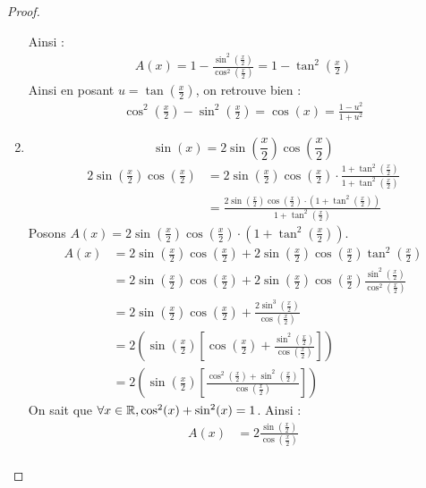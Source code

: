 \begin{proof}
\begin{enumerate}
             Ainsi : 
             \begin{align*}
                 A(x) = 1 - \frac{\sin^2\left( \frac{x}{2} \right)}{\cos^2\left( \frac{x}{2} \right)} = 1 - \tan^2 \left( \frac{x}{2} \right)
             \end{align*}
             Ainsi en posant $u = \tan(\frac{x}{2})$, on retrouve bien :
             \begin{align*}
                 \cos^2\left( \frac{x}{2} \right) - \sin^2\left( \frac{x}{2} \right) = \cos(x) = \frac{1 - u^2}{1 + u^2}
             \end{align*}
     \item \[ \sin(x) =  2 \sin(\frac{x}{2}) \cos(\frac{x}{2}) \]
        \begin{align*}
            2\sin(\frac{x}{2})\cos(\frac{x}{2}) &= 2\sin(\frac{x}{2})\cos(\frac{x}{2}) \cdot \frac{1 + \tan^2 \left( \frac{x}{2} \right)}{1 + \tan^2 \left( \frac{x}{2} \right)} \\
            &= \frac{2\sin(\frac{x}{2})\cos(\frac{x}{2}) \cdot \left( 1 + \tan^2 \left( \frac{x}{2} \right) \right)}{1 + \tan^2 \left( \frac{x}{2} \right)}
        \end{align*}
        Posons $A(x) = 2\sin(\frac{x}{2})\cos(\frac{x}{2}) \cdot \left( 1 + \tan^2 \left( \frac{x}{2} \right) \right)$.
        \begin{align*}
            A(x) &= 2\sin(\frac{x}{2})\cos(\frac{x}{2}) + 2\sin(\frac{x}{2})\cos(\frac{x}{2}) \tan^2 \left( \frac{x}{2} \right) \\
            &= 2\sin(\frac{x}{2})\cos(\frac{x}{2}) + 2\sin(\frac{x}{2})\cos(\frac{x}{2}) \frac{\sin^2 \left( \frac{x}{2} \right)}{\cos^2 \left( \frac{x}{2} \right)} \\
            &= 2\sin(\frac{x}{2})\cos(\frac{x}{2}) + \frac{2 \sin^3 \left( \frac{x}{2} \right)}{\cos(\frac{x}{2})} \\ 
            &= 2 \left( \sin(\frac{x}{2}) \left[ \cos(\frac{x}{2}) + \frac{\sin^2 \left( \frac{x}{2} \right)}{\cos(\frac{x}{2})} \right] \right) \\
            &= 2 \left( \sin(\frac{x}{2}) \left[ \frac{\cos^2 \left(\frac{x}{2}\right) + \sin^2 \left( \frac{x}{2} \right)}{\cos(\frac{x}{2})} \right] \right)
        \end{align*}
        On sait que $\forall x \in \mathbb{R}, \cos^2(x) + \sin^2(x) = 1$. Ainsi :
        \begin{align*}
            A(x) &= 2 \frac{\sin(\frac{x}{2})}{\cos(\frac{x}{2})} \\

\end{align*}
\end{enumerate}
\end{proof}
